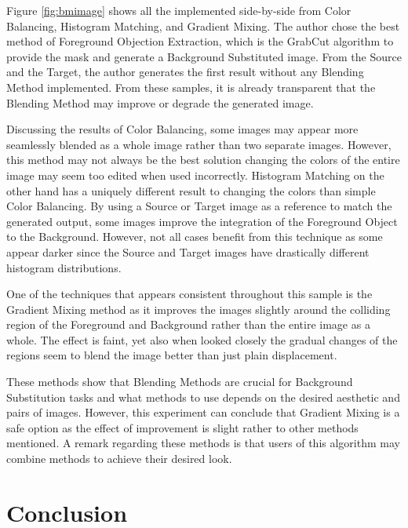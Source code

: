 \documentclass{article}
\begin{document}
Figure \ref{fig:bmimage} shows all the implemented side-by-side from Color Balancing, Histogram Matching, and Gradient Mixing. The author chose the best method of Foreground Objection Extraction, which is the GrabCut algorithm to provide the mask and generate a Background Substituted image. From the Source and the Target, the author generates the first result without any Blending Method implemented. From these samples, it is already transparent that the Blending Method may improve or degrade the generated image.

Discussing the results of Color Balancing, some images may appear more seamlessly blended as a whole image rather than two separate images. However, this method may not always be the best solution changing the colors of the entire image may seem too edited when used incorrectly. Histogram Matching on the other hand has a uniquely different result to changing the colors than simple Color Balancing. By using a Source or Target image as a reference to match the generated output, some images improve the integration of the Foreground Object to the Background. However, not all cases benefit from this technique as some appear darker since the Source and Target images have drastically different histogram distributions.

One of the techniques that appears consistent throughout this sample is the Gradient Mixing method as it improves the images slightly around the colliding region of the Foreground and Background rather than the entire image as a whole. The effect is faint, yet also when looked closely the gradual changes of the regions seem to blend the image better than just plain displacement.

These methods show that Blending Methods are crucial for Background Substitution tasks and what methods to use depends on the desired aesthetic and pairs of images. However, this experiment can conclude that Gradient Mixing is a safe option as the effect of improvement is slight rather to other methods mentioned. A remark regarding these methods is that users of this algorithm may combine methods to achieve their desired look.

\section{Conclusion}
\end{document}
